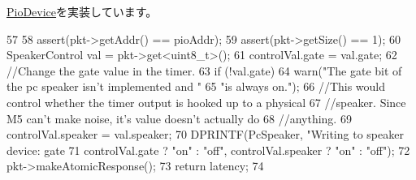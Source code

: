 \hyperlink{classPioDevice_afe8371668d023bb2516b286e5e399b6f}{PioDevice}を実装しています。


\begin{DoxyCode}
57 {
58     assert(pkt->getAddr() == pioAddr);
59     assert(pkt->getSize() == 1);
60     SpeakerControl val = pkt->get<uint8_t>();
61     controlVal.gate = val.gate;
62     //Change the gate value in the timer.
63     if (!val.gate)
64         warn("The gate bit of the pc speaker isn't implemented and "
65                 "is always on.\n");
66     //This would control whether the timer output is hooked up to a physical
67     //speaker. Since M5 can't make noise, it's value doesn't actually do
68     //anything.
69     controlVal.speaker = val.speaker;
70     DPRINTF(PcSpeaker, "Writing to speaker device: gate %
71             controlVal.gate ? "on" : "off", controlVal.speaker ? "on" : "off");
72     pkt->makeAtomicResponse();
73     return latency;
74 }
\end{DoxyCode}


